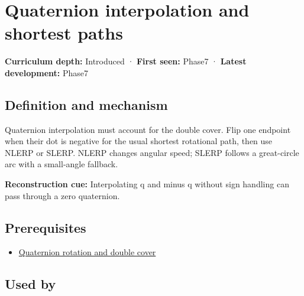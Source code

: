 \hypertarget{appendix-9b4b8254f26b}{}\label{referencestart:appendix-9b4b8254f26b}
\section{Quaternion interpolation and shortest paths}\label{appendix-9b4b8254f26b-quaternion-interpolation-and-shortest-paths}

\hypertarget{appendix-9b4b8254f26b-quaternion-interpolation-and-shortest-paths}{}

\textbf{Curriculum depth:} Introduced · \textbf{First seen:} Phase7 · \textbf{Latest development:} Phase7

\begin{allmightroledefinition}

\subsection{Definition and mechanism}\label{appendix-9b4b8254f26b-definition-and-mechanism}

\hypertarget{appendix-9b4b8254f26b-definition-and-mechanism}{}

Quaternion interpolation must account for the double cover. Flip one endpoint when their dot is negative for the usual shortest rotational path, then use NLERP or SLERP. NLERP changes angular speed; SLERP follows a great-circle arc with a small-angle fallback.

\end{allmightroledefinition}

\textbf{Reconstruction cue:} Interpolating q and minus q without sign handling can pass through a zero quaternion.

\subsection{Prerequisites}\label{appendix-9b4b8254f26b-prerequisites}

\hypertarget{appendix-9b4b8254f26b-prerequisites}{}

\begin{itemize}
\tightlist
\item
  \hyperref[appendix-8e61ab68f6b2]{Quaternion rotation and double cover}
\end{itemize}

\subsection{Used by}\label{appendix-9b4b8254f26b-used-by}

